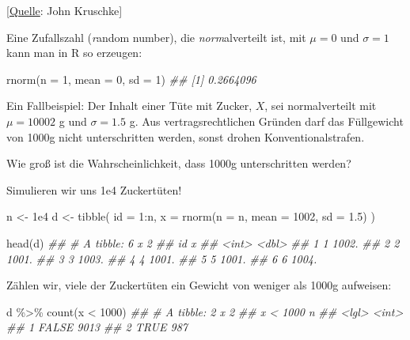 \documentclass[
  a4paper,
  DIV=11]{scrreprt}
\newenvironment{Shaded}{\begin{snugshade}}{\end{snugshade}}
\newcommand{\AttributeTok}[1]{\textcolor[rgb]{0.40,0.45,0.13}{#1}}
\newcommand{\DecValTok}[1]{\textcolor[rgb]{0.68,0.00,0.00}{#1}}
\newcommand{\DocumentationTok}[1]{\textcolor[rgb]{0.37,0.37,0.37}{\textit{#1}}}
\newcommand{\FloatTok}[1]{\textcolor[rgb]{0.68,0.00,0.00}{#1}}
\newcommand{\FunctionTok}[1]{\textcolor[rgb]{0.28,0.35,0.67}{#1}}
\newcommand{\NormalTok}[1]{\textcolor[rgb]{0.00,0.23,0.31}{#1}}
\newcommand{\OtherTok}[1]{\textcolor[rgb]{0.00,0.23,0.31}{#1}}
\newcommand{\SpecialCharTok}[1]{\textcolor[rgb]{0.37,0.37,0.37}{#1}}
\theoremstyle{definition}
\theoremstyle{remark}
\begin{document}
{[}\href{https://jkkweb.sitehost.iu.edu/KruschkeFreqAndBayesAppTutorial.html\#data_are_described_by_mathematical_models}{Quelle}:
John Kruschke{]}

Eine Zufallszahl (\emph{r}andom number), die \emph{norm}alverteilt ist,
mit \(\mu=0\) und \(\sigma=1\) kann man in R so erzeugen:

\begin{Shaded}
\begin{Highlighting}[]
\FunctionTok{rnorm}\NormalTok{(}\AttributeTok{n =} \DecValTok{1}\NormalTok{, }\AttributeTok{mean =} \DecValTok{0}\NormalTok{, }\AttributeTok{sd =} \DecValTok{1}\NormalTok{)}
\DocumentationTok{\#\# [1] 0.2664096}
\end{Highlighting}
\end{Shaded}

Ein Fallbeispiel: Der Inhalt einer Tüte mit Zucker, \(X\), sei
normalverteilt mit \(\mu = 10002\) g und \(\sigma=1.5\) g. Aus
vertragsrechtlichen Gründen darf das Füllgewicht von 1000g nicht
unterschritten werden, sonst drohen Konventionalstrafen.

Wie groß ist die Wahrscheinlichkeit, dass 1000g unterschritten werden?

Simulieren wir uns 1e4 Zuckertüten!

\begin{Shaded}
\begin{Highlighting}[]
\NormalTok{n }\OtherTok{\textless{}{-}} \FloatTok{1e4}
\NormalTok{d }\OtherTok{\textless{}{-}} 
  \FunctionTok{tibble}\NormalTok{(}
    \AttributeTok{id =} \DecValTok{1}\SpecialCharTok{:}\NormalTok{n,}
    \AttributeTok{x =} \FunctionTok{rnorm}\NormalTok{(}\AttributeTok{n =}\NormalTok{ n, }\AttributeTok{mean =} \DecValTok{1002}\NormalTok{, }\AttributeTok{sd =} \FloatTok{1.5}\NormalTok{)}
\NormalTok{  )}

\FunctionTok{head}\NormalTok{(d)}
\DocumentationTok{\#\# \# A tibble: 6 x 2}
\DocumentationTok{\#\#      id     x}
\DocumentationTok{\#\#   \textless{}int\textgreater{} \textless{}dbl\textgreater{}}
\DocumentationTok{\#\# 1     1 1002.}
\DocumentationTok{\#\# 2     2 1001.}
\DocumentationTok{\#\# 3     3 1003.}
\DocumentationTok{\#\# 4     4 1001.}
\DocumentationTok{\#\# 5     5 1001.}
\DocumentationTok{\#\# 6     6 1004.}
\end{Highlighting}
\end{Shaded}

Zählen wir, viele der Zuckertüten ein Gewicht von weniger als 1000g
aufweisen:

\begin{Shaded}
\begin{Highlighting}[]
\NormalTok{d }\SpecialCharTok{\%\textgreater{}\%} 
  \FunctionTok{count}\NormalTok{(x }\SpecialCharTok{\textless{}} \DecValTok{1000}\NormalTok{)}
\DocumentationTok{\#\# \# A tibble: 2 x 2}
\DocumentationTok{\#\#   \textasciigrave{}x \textless{} 1000\textasciigrave{}     n}
\DocumentationTok{\#\#   \textless{}lgl\textgreater{}      \textless{}int\textgreater{}}
\DocumentationTok{\#\# 1 FALSE       9013}
\DocumentationTok{\#\# 2 TRUE         987}
\end{Highlighting}
\end{Shaded}
\end{document}
